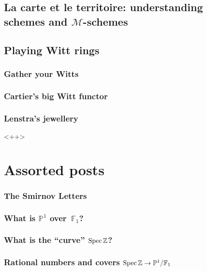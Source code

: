 \documentclass[a4paper]{memoir}
\begin{document}
\chapter{La carte et le territoire: understanding schemes and $\mathcal{M}$-schemes}








\chapter{Playing Witt rings}
\section{Gather your Witts}
\section{Cartier's big Witt functor}
\section{Lenstra's jewellery}<++>






\part{Assorted posts}

\setcounter{section}{0}

\section{The Smirnov Letters}

\section{What is $\mathbb{P}^1$ over~$\mathbb{F}_1$?}

\section{What is the ``curve'' $\operatorname{Spec}\mathbb{Z}$?}

\section{Rational numbers and covers $\operatorname{Spec}\mathbb{Z}\to\mathbb{P}^1/\mathbb{F}_1$}
\end{document}
